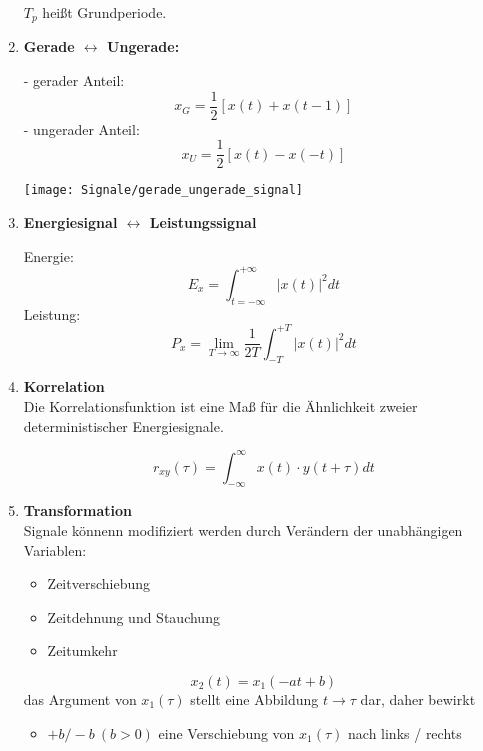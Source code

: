 \begin{enumerate}
\begin{mdframed}[style=exercise]
              $T_p$ hei{\ss}t Grundperiode.
          \end{mdframed}
      \item{\textbf{Gerade \hfill $\longleftrightarrow$ \hfill Ungerade:}}\\
          \begin{mdframed}[style=exercise,frametitle=Zerlegung des Signals:]
              - gerader Anteil: \[x_G=\frac{1}{2}\left[x(t)+x(t-1)\right]\]
              - ungerader Anteil: \[x_U=\frac{1}{2}\left[ x(t)-x(-t) \right]\]
          \end{mdframed}
          \begin{center}
              \texttt{[image: Signale/gerade\_ungerade\_signal]}
          \end{center}
      \item{\textbf{Energiesignal \hfill $\longleftrightarrow$ \hfill Leistungssignal}}
          \begin{mdframed}[style=exercise]
              Energie: \[E_x=\int_{t=-\infty}^{+\infty}\lvert x(t)\rvert^2 dt\]
              Leistung: \[P_x=\lim_{T\to\infty}\frac{1}{2T}\int_{-T}^{+T}\lvert x(t)\rvert^2 dt\]
          \end{mdframed}
      \item{\textbf{Korrelation}}\\
          Die Korrelationsfunktion ist eine Ma{\ss} f\"ur die \"Ahnlichkeit
          zweier deterministischer Energiesignale.
          \begin{mdframed}[style=exercise,frametitle=Korrelationsfunktion]
              \[
                  r_{xy}(\tau) = \int_{-\infty}^{\infty}x(t)\cdot y(t+\tau)dt
              \]
          \end{mdframed}
      \item{\textbf{Transformation}}\\
          Signale k\"onnenn modifiziert werden durch Ver\"andern der
          unabh\"angigen Variablen:
          \begin{itemize}
              \item Zeitverschiebung
              \item Zeitdehnung und Stauchung
              \item Zeitumkehr
          \end{itemize}
          \begin{mdframed}[style=exercise]
              \[
                  x_2(t) = x_1(-at+b)
              \]
          das Argument von $x_1(\tau)$ stellt eine Abbildung $t\rightarrow\tau$
          dar, daher bewirkt
          \begin{itemize}
              \item{$+b / -b\ (b > 0)$ eine Verschiebung von $x_1(\tau)$ nach links / rechts}


\end{itemize}
\end{mdframed}
\end{enumerate}
